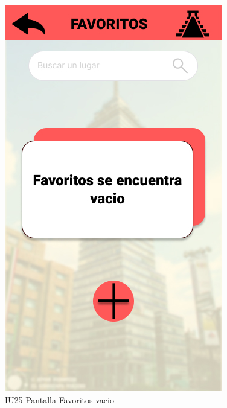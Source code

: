 \begin{figure}[h]
    \begin{minipage}{0.5\textwidth}
        \centering
        \includegraphics[width=.7\linewidth]{Pantallas Prototipo3/IU25 Pantalla Favoritos vacio.jpg}
        \caption{IU25 Pantalla Favoritos vacio}
    \end{minipage}
    

\end{figure}
